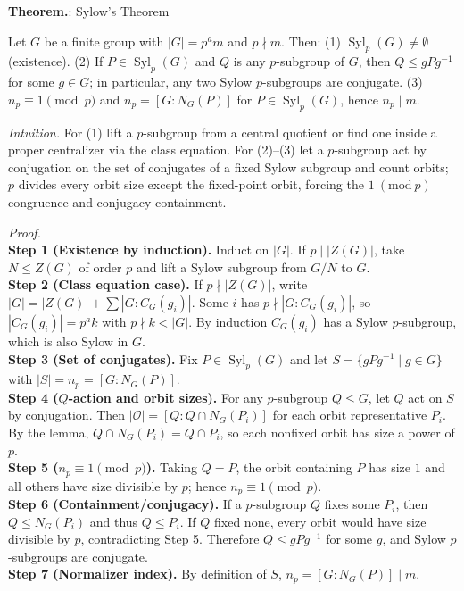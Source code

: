 \documentclass[12pt]{article}
\theoremstyle{definition}
\newcommand{\Syl}{\operatorname{Syl}}
\begin{document}
\newpage


\noindent\textbf{Theorem.}: Sylow’s Theorem

\newpage

Let $G$ be a finite group with $|G|=p^a m$ and $p\nmid m$. Then: (1) $\Syl_p(G)\neq\emptyset$ (existence). (2) If $P\in\Syl_p(G)$ and $Q$ is any $p$-subgroup of $G$, then $Q\le gPg^{-1}$ for some $g\in G$; in particular, any two Sylow $p$-subgroups are conjugate. (3) $n_p\equiv 1\pmod p$ and $n_p=[G:N_G(P)]$ for $P\in\Syl_p(G)$, hence $n_p\mid m$.\\

\dotfill

\emph{Intuition.} For (1) lift a $p$-subgroup from a central quotient or find one inside a proper centralizer via the class equation. For (2)–(3) let a $p$-subgroup act by conjugation on the set of conjugates of a fixed Sylow subgroup and count orbits; $p$ divides every orbit size except the fixed-point orbit, forcing the $1\ (\mathrm{mod}\ p)$ congruence and conjugacy containment.

\dotfill

\emph{Proof.}\\
\textbf{Step 1 (Existence by induction).} Induct on $|G|$. If $p\mid |Z(G)|$, take $N\le Z(G)$ of order $p$ and lift a Sylow subgroup from $G/N$ to $G$.\\
\textbf{Step 2 (Class equation case).} If $p\nmid |Z(G)|$, write $|G|=|Z(G)|+\sum |G:C_G(g_i)|$. Some $i$ has $p\nmid |G:C_G(g_i)|$, so $|C_G(g_i)|=p^a k$ with $p\nmid k<|G|$. By induction $C_G(g_i)$ has a Sylow $p$-subgroup, which is also Sylow in $G$.\\
\textbf{Step 3 (Set of conjugates).} Fix $P\in \Syl_p(G)$ and let $S=\{gPg^{-1}\mid g\in G\}$ with $|S|=n_p=[G:N_G(P)]$.\\
\textbf{Step 4 ($Q$-action and orbit sizes).} For any $p$-subgroup $Q\le G$, let $Q$ act on $S$ by conjugation. Then $|{\mathcal O}|=[Q:Q\cap N_G(P_i)]$ for each orbit representative $P_i$. By the lemma, $Q\cap N_G(P_i)=Q\cap P_i$, so each nonfixed orbit has size a power of $p$.\\
\textbf{Step 5 ($n_p\equiv 1\pmod p$).} Taking $Q=P$, the orbit containing $P$ has size $1$ and all others have size divisible by $p$; hence $n_p\equiv 1\pmod p$.\\
\textbf{Step 6 (Containment/conjugacy).} If a $p$-subgroup $Q$ fixes some $P_i$, then $Q\le N_G(P_i)$ and thus $Q\le P_i$. If $Q$ fixed none, every orbit would have size divisible by $p$, contradicting Step 5. Therefore $Q\le gPg^{-1}$ for some $g$, and Sylow $p$-subgroups are conjugate.\\
\textbf{Step 7 (Normalizer index).} By definition of $S$, $n_p=[G:N_G(P)]\mid m$.\\
\end{document}
